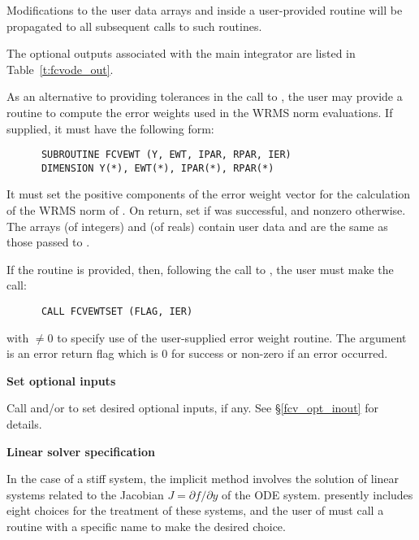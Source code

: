 \begin{Steps}
{    Modifications to the user data arrays  and  inside a 
    user-provided routine will be propagated to all subsequent calls to
    such routines.

    The optional outputs associated with the main {\cvode} integrator
    are listed in Table~\ref{t:fcvode_out}.
  }

  As an alternative to providing tolerances in the call to , the
  user may provide a routine to compute the error weights used in the WRMS norm
  evaluations. If supplied, it must have the following form:
\begin{verbatim}
      SUBROUTINE FCVEWT (Y, EWT, IPAR, RPAR, IER)
      DIMENSION Y(*), EWT(*), IPAR(*), RPAR(*)
\end{verbatim}
  It must set the positive components of the error weight vector  for
  the calculation of the WRMS norm of . On return, set
   if  was successful, and nonzero otherwise.
  The arrays  (of integers) and  (of reals) contain user data
  and are the same as those passed to .

  If the  routine is provided, then, 
  following the call to , the user must make the call:
\begin{verbatim}
      CALL FCVEWTSET (FLAG, IER)
\end{verbatim}
  with  $\neq 0$ to specify use of the user-supplied error weight routine.
  The argument  is an error return flag which is $0$ 
  for success or non-zero if an error occurred.

\item\label{i:fcv_opt_input}{\bf Set optional inputs} 

  Call  and/or  to set desired optional inputs,
  if any.  See \S\ref{fcv_opt_inout} for details.

\item\label{i:fcvode_lin_solv_spec} {\bf Linear solver specification} 
  
  In the case of a stiff system, the implicit  method involves the solution
  of linear systems related to the Jacobian $J = \partial f / \partial y$
  of the ODE system.  {\cvode} presently includes eight choices for the treatment
  of these systems, and the user of {\fcvode} must call a routine with a
  specific name to make the desired choice.


\end{Steps}
